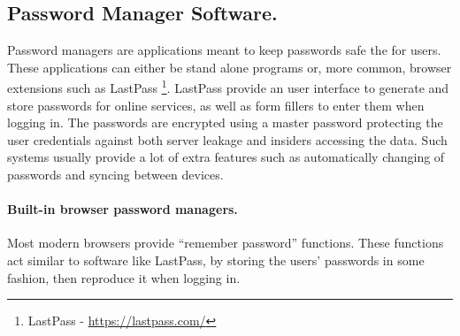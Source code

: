 \subsection{Password Manager Software.} \label{subsec:pms}
Password managers are applications meant to keep passwords safe the for users. These applications can either be stand alone programs or, more common, browser extensions such as LastPass \footnote{LastPass - \url{https://lastpass.com/}}. LastPass provide an user interface to generate and store passwords for online services, as well as form fillers to enter them when logging in. The passwords are encrypted using a master password protecting the user credentials against both server leakage and insiders accessing the data. Such systems usually provide a lot of extra features such as automatically changing of passwords and syncing between devices. 

\paragraph{Built-in browser password managers.} Most modern browsers provide ``remember password'' functions. These functions act similar to software like LastPass, by storing the users' passwords in some fashion, then reproduce it when logging in. 

